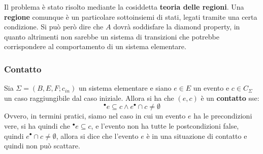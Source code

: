 Il problema è stato risolto mediante la cosiddetta \textbf{teoria delle regioni}. Una \textbf{regione} comunque è un particolare sottoinsiemi di stati, legati tramite una certa condizione. Si può però dire che $A$ dovrà soddisfare la diamond property, in quanto altrimenti non sarebbe un sistema di transizioni che potrebbe corrispondere al comportamento di un sistema elementare.

\subsubsection{Contatto}
Sia $\Sigma = (B,E,F;c_{in})$ un sistema elementare e siano $e\in E$ un evento e $c\in C_\Sigma$ un caso raggiungibile dal caso iniziale. Allora si ha che $(e,c)$ è un \textbf{contatto} sse: \[^\bullet e\subseteq c \wedge e^\bullet \cap c \neq\emptyset\] Ovvero, in termini pratici, siamo nel caso in cui un evento $e$ ha le precondizioni vere, si ha quindi che $^\bullet e\subseteq c$, e l'evento non ha tutte le postcondizioni false, quindi $e^\bullet \cap c \neq\emptyset$, allora si dice che l'evento $e$ è in una situazione di contatto e quindi non può scattare.



